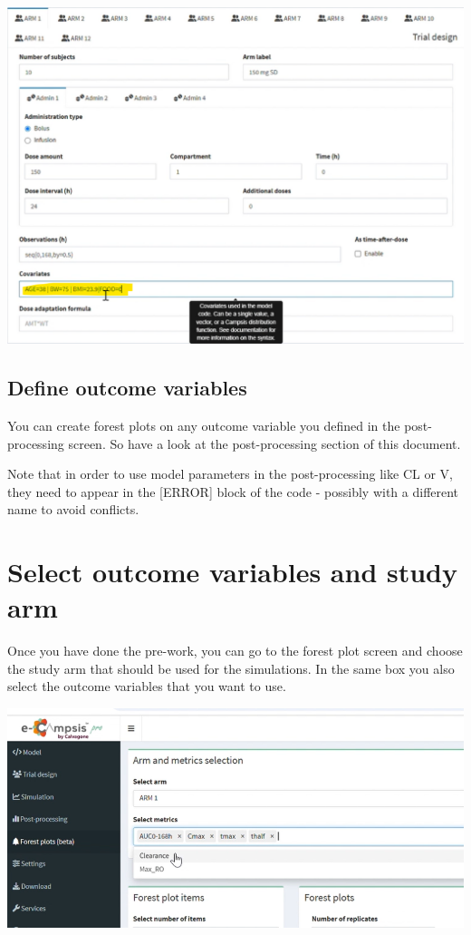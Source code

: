 \documentclass[
]{book}
\begin{document}
\includegraphics{pictures/design_forest_plot.png}

\subsection{Define outcome variables}\label{define-outcome-variables}

You can create forest plots on any outcome variable you defined in the post-processing screen. So have a look at the post-processing section of this document.

Note that in order to use model parameters in the post-processing like CL or V, they need to appear in the {[}ERROR{]} block of the code - possibly with a different name to avoid conflicts.

\section{Select outcome variables and study arm}\label{select-outcome-variables-and-study-arm}

Once you have done the pre-work, you can go to the forest plot screen and choose the study arm that should be used for the simulations. In the same box you also select the outcome variables that you want to use.

\includegraphics{pictures/forest_plots_arms.png}
\end{document}
